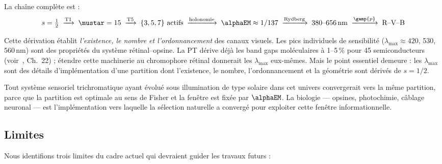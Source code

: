 \documentclass[12pt,a4paper]{article}
\begin{document}
La cha\^ine compl\`ete est :
\begin{equation}
  s = \tfrac{1}{2}
  \;\xrightarrow{\text{T1}}\;
  \mustar = 15
  \;\xrightarrow{\text{T5}}\;
  \{3,5,7\} \text{ actifs}
  \;\xrightarrow{\text{holonomie}}\;
  \alphaEM \approx 1/137
  \;\xrightarrow{\text{Rydberg}}\;
  380\text{--}656\,\text{nm}
  \;\xrightarrow{\gamp{p}}\;
  \text{R--V--B}
  \label{eq:chain}
\end{equation}

\begin{remark}
Cette d\'erivation \'etablit \emph{l'existence, le nombre et
l'ordonnancement} des canaux visuels. Les pics individuels de
sensibilit\'e ($\lambda_{\max} \approx 420$, 530, 560\,nm) sont des
propri\'et\'es du syst\`eme r\'etinal--opsine. La PT d\'erive d\'ej\`a
les band gaps mol\'eculaires \`a 1--5\,\% pour 45 semiconducteurs
(voir~\cite{senez2026math}, Ch.~22) ; \'etendre cette machinerie au
chromophore r\'etinal donnerait les $\lambda_{\max}$ eux-m\^emes.
Mais le point essentiel demeure : les $\lambda_{\max}$ sont des
d\'etails d'impl\'ementation d'une partition dont l'existence, le
nombre, l'ordonnancement et la g\'eom\'etrie sont d\'eriv\'es de
$s = 1/2$.
\end{remark}

\begin{remark}
Tout syst\`eme sensoriel trichromatique ayant \'evolu\'e sous
illumination de type solaire dans cet univers convergerait vers la
m\^eme partition, parce que la partition est optimale au sens de Fisher
et la fen\^etre est fix\'ee par $\alphaEM$. La biologie --- opsines,
photochimie, c\^ablage neuronal --- est l'impl\'ementation vers
laquelle la s\'election naturelle a converg\'e pour exploiter cette
fen\^etre informationnelle.
\end{remark}

\subsection{Limites}

Nous identifions trois limites du cadre actuel qui devraient guider les
travaux futurs :
\end{document}
